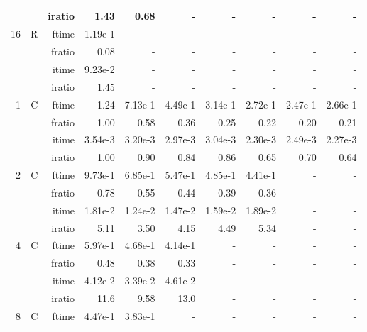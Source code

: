 \documentclass[a4paper]{article}
\begin{document}
\begin{table}[htbp]
\begin{center}
\begin{small}
\begin{tabular}{|r|r|r|r|r|r|r|r|r|r|}
             &             &  iratio &    1.43  &    0.68 &      - &      - &      - &      - &      - \\\hline
   16 &   R &   ftime &    1.19e-1 &      - &      - &      - &      - &      - &      - \\
             &             &  fratio &    0.08 &     - &      - &      - &      - &      - &      - \\
             &             &  itime &    9.23e-2 &      - &      - &      - &      - &      - &      - \\
             &             &  iratio &   1.45  &      - &      - &      - &      - &      - &      - \\\hline\hline
   1 &   C &  ftime &    1.24  &    7.13e-1 &    4.49e-1 &    3.14e-1 &    2.72e-1 &    2.47e-1 &    2.66e-1 \\
             &             &  fratio &    1.00 &    0.58 &    0.36 &    0.25 &   0.22 &    0.20 &    0.21 \\
             &             &  itime &    3.54e-3 &    3.20e-3 &    2.97e-3 &    3.04e-3 &    2.30e-3 &    2.49e-3 &    2.27e-3 \\
             &             &  iratio &    1.00 &    0.90 &    0.84 &    0.86 &    0.65 &    0.70 &    0.64 \\\hline
   2 &  C &  ftime &    9.73e-1 &    6.85e-1 &    5.47e-1 &    4.85e-1 &    4.41e-1 &      - &      - \\
             &             &  fratio &    0.78 &    0.55 &    0.44 &    0.39 &    0.36 &      - &      - \\
             &             &  itime &    1.81e-2 &    1.24e-2 &    1.47e-2 &    1.59e-2 &    1.89e-2 &      - &      - \\
             &             &  iratio &    5.11  &    3.50  &    4.15  &    4.49  &    5.34  &      - &      - \\\hline
   4 &  C &  ftime &    5.97e-1 &    4.68e-1 &    4.14e-1 &      - &      - &      - &      - \\
             &             &  fratio &    0.48 &    0.38 &    0.33 &      - &      - &      - &      - \\
             &             &  itime &    4.12e-2 &    3.39e-2 &    4.61e-2 &      - &      - &      - &      - \\
             &             &  iratio &    11.6 &   9.58  &    13.0 &     - &      - &      - &      - \\\hline
   8 &   C &  ftime &    4.47e-1 &    3.83e-1 &      - &      - &      - &      - &      - \\

\end{tabular}
\end{small}
\end{center}
\end{table}
\end{document}

